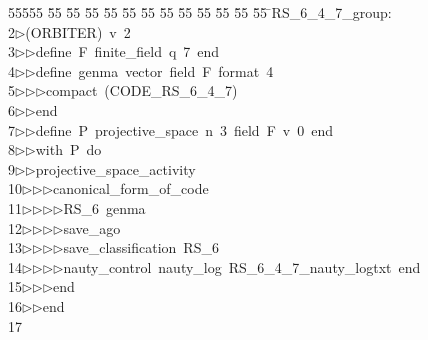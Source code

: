 %
%
\begin{tabbing}
55555 \= 55 \= 55 \= 55 \= 55 \= 55 \= 55 \= 55 \= 55 \= 55 \= 55 \= 55 \= 55 \= \>RS\_6\_4\_7\_group:\\[0pt]
2\>$\triangleright$\>(ORBITER)\ v\ 2\ \\[0pt]
3\>$\triangleright$\>$\triangleright$\>define\ F\ finite\_field\ q\ 7\ end\ \\[0pt]
4\>$\triangleright$\>$\triangleright$\>define\ genma\ vector\ field\ F\ format\ 4\ \\[0pt]
5\>$\triangleright$\>$\triangleright$\>$\triangleright$\>compact\ (CODE\_RS\_6\_4\_7)\ \\[0pt]
6\>$\triangleright$\>$\triangleright$\>end\ \\[0pt]
7\>$\triangleright$\>$\triangleright$\>define\ P\ projective\_space\ n\ 3\ field\ F\ v\ 0\ end\ \\[0pt]
8\>$\triangleright$\>$\triangleright$\>with\ P\ do\ \\[0pt]
9\>$\triangleright$\>$\triangleright$\>projective\_space\_activity\ \\[0pt]
10\>$\triangleright$\>$\triangleright$\>$\triangleright$\>canonical\_form\_of\_code\ \\[0pt]
11\>$\triangleright$\>$\triangleright$\>$\triangleright$\>$\triangleright$\>RS\_6\ genma\ \\[0pt]
12\>$\triangleright$\>$\triangleright$\>$\triangleright$\>$\triangleright$\>save\_ago\ \\[0pt]
13\>$\triangleright$\>$\triangleright$\>$\triangleright$\>$\triangleright$\>save\_classification\ RS\_6\ \\[0pt]
14\>$\triangleright$\>$\triangleright$\>$\triangleright$\>$\triangleright$\>nauty\_control\ nauty\_log\ RS\_6\_4\_7\_nauty\_logtxt\ end\ \\[0pt]
15\>$\triangleright$\>$\triangleright$\>$\triangleright$\>end\ \\[0pt]
16\>$\triangleright$\>$\triangleright$\>end\\[0pt]
17\>\end{tabbing}

